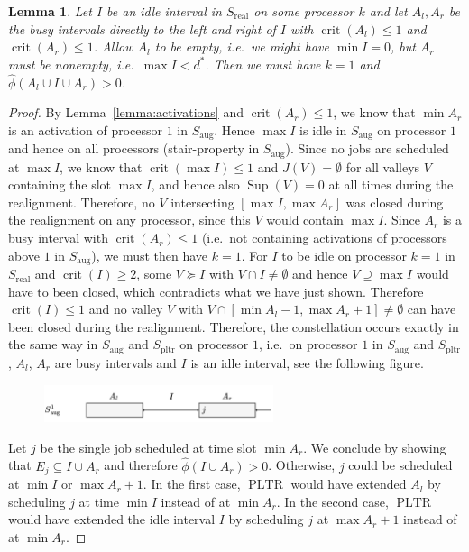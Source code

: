 \documentclass[a4paper]{article}
\DeclareMathOperator{\pltr}{pltr}
\DeclareMathOperator{\PLTR}{PLTR}
\DeclareMathOperator{\aug}{aug}
\DeclareMathOperator{\real}{real}
\DeclareMathOperator{\crit}{crit}
\DeclareMathOperator{\res}{Sup}
\newtheorem{lemma}[theorem]{Lemma}
\begin{document}
\begin{lemma}\label{lemma:constellation}
  Let $I$ be an idle interval in $S_{\real}$ on some processor $k$ and let $A_l, A_r$ be the busy intervals directly to the left and right of $I$ with $\crit(A_l) \leq 1$ and $\crit(A_r) \leq 1$.
  Allow $A_l$ to be empty, i.e.\ we might have $\min I = 0$, but $A_r$ must be nonempty, i.e.\ $\max I < d^*$.
  Then we must have $k = 1$ and $\hat \phi(A_l \cup I \cup A_r) > 0$.
\end{lemma}
\begin{proof}
  By Lemma~\ref{lemma:activations} and $\crit(A_r) \leq 1$, we know that $\min A_r$ is an activation of processor $1$ in $S_{\aug}$.
  Hence $\max I$ is idle in $S_{\aug}$ on processor $1$ and hence on all processors (stair-property in $S_{\aug}$).
  Since no jobs are scheduled at $\max I$, we know that $\crit(\max I) \leq 1$ and $J(V) = \emptyset$ for all valleys $V$ containing the slot $\max I$, and hence also $\res(V) = 0$ at all times during the realignment.
  Therefore, no $V$ intersecting $[\max I, \max A_r]$ was closed during the realignment on any processor, since this $V$ would contain $\max I$.
  Since $A_r$ is a busy interval with $\crit(A_r) \leq 1$ (i.e.\ not containing activations of processors above $1$ in $S_{\aug}$), we must then have $k = 1$.
  For $I$ to be idle on processor $k = 1$ in $S_{\real}$ and $\crit(I) \geq 2$, some $V \succeq I$ with $V \cap I \neq \emptyset$ and hence $V \supseteq \max I$ would have to been closed, which contradicts what we have just shown.
  Therefore $\crit(I) \leq 1$ and no valley $V$ with $V \cap [\min A_l - 1, \max A_r + 1] \neq \emptyset$ can have been closed during the realignment.
  Therefore, the constellation occurs exactly in the same way in $S_{\aug}$ and $S_{\pltr}$ on processor $1$, i.e.\ on processor $1$ in $S_{\aug}$ and $S_{\pltr}$, $A_l$, $A_r$ are busy intervals and $I$ is an idle interval, see the following figure.

  \begin{figure}[H]
    \centering
    \includegraphics[width=0.6\textwidth]{graphics/constellation.jpg}
    \label{fig:constellation}
  \end{figure}
  Let $j$ be the single job scheduled at time slot $\min A_r$.
  We conclude by showing that $E_j \subseteq I \cup A_r$ and therefore $\hat \phi(I \cup A_r) > 0$.
  Otherwise, $j$ could be scheduled at $\min I$ or $\max A_r + 1$.
  In the first case, $\PLTR$ would have extended $A_l$ by scheduling $j$ at time $\min I$ instead of at $\min A_r$.
  In the second case, $\PLTR$ would have extended the idle interval $I$ by scheduling $j$ at $\max A_r + 1$ instead of at $\min A_r$.
\end{proof}
\end{document}
